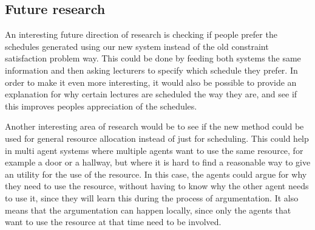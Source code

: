 \subsection{Future research}
An interesting future direction of research is checking if people prefer
the schedules generated using our new system instead of the old constraint
satisfaction problem way. This could be done by feeding both systems
the same information and then asking lecturers to specify which schedule
they prefer. In order to make it even more interesting, it would also be
possible to provide an explanation for why certain lectures are scheduled
the way they are, and see if this improves peoples appreciation of the
schedules.

Another interesting area of research would be to see if the new method
could be used for general resource allocation instead of just for
scheduling. This could help in multi agent systems where multiple agents
want to use the same resource, for example a door or a hallway, but where
it is hard to find a reasonable way to give an utility for the use of the
resource. In this case, the agents could argue for why they need to use the
resource, without having to know why the other agent needs to use it, since
they will learn this during the process of argumentation. It also means
that the argumentation can happen locally, since only the agents that want
to use the resource at that time need to be involved.
